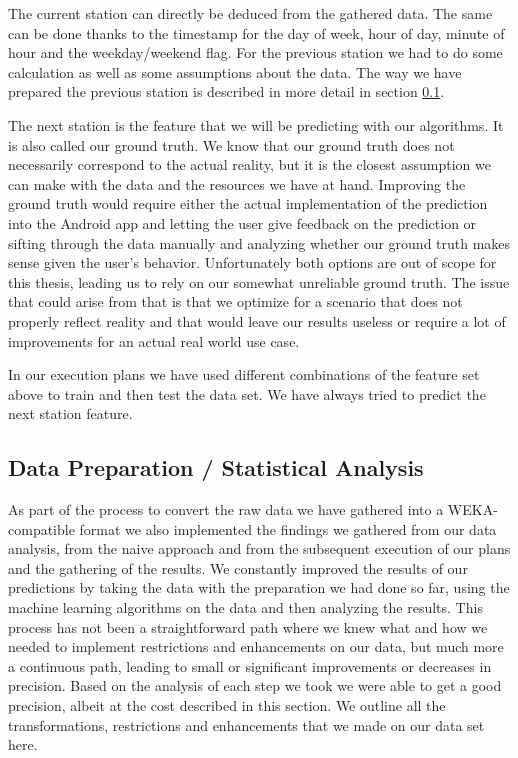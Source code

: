 The current station can directly be deduced from the gathered data. The same can be done thanks to the timestamp for the day of week, hour of day, minute of hour and the weekday/weekend flag. For the previous station we had to do some calculation as well as some assumptions about the data. The way we have prepared the previous station is described in more detail in section \ref{subsec:data_preparation}.  

The next station is the feature that we will be predicting with our algorithms. It is also called our ground truth. We know that our ground truth does not necessarily correspond to the actual reality, but it is the closest assumption we can make with the data and the resources we have at hand. Improving the ground truth would require either the actual implementation of the prediction into the Android app and letting the user give feedback on the prediction or sifting through the data manually and analyzing whether our ground truth makes sense given the user's behavior. Unfortunately both options are out of scope for this thesis, leading us to rely on our somewhat unreliable ground truth. The issue that could arise from that is that we optimize for a scenario that does not properly reflect reality and that would leave our results useless or require a lot of improvements for an actual real world use case.

In our execution plans we have used different combinations of the feature set above to train and then test the data set. We have always tried to predict the next station feature.


\subsection{Data Preparation / Statistical Analysis}
\label{subsec:data_preparation}
As part of the process to convert the raw data we have gathered into a WEKA-compatible format we also implemented the findings we gathered from our data analysis, from the naive approach and from the subsequent execution of our plans and the gathering of the results. We constantly improved the results of our predictions by taking the data with the preparation we had done so far, using the machine learning algorithms on the data and then analyzing the results. This process has not been a straightforward path where we knew what and how we needed to implement restrictions and enhancements on our data, but much more a continuous path, leading to small or significant improvements or decreases in precision. Based on the analysis of each step we took we were able to get a good precision, albeit at the cost described in this section. We outline all the transformations, restrictions and enhancements that we made on our data set here.


